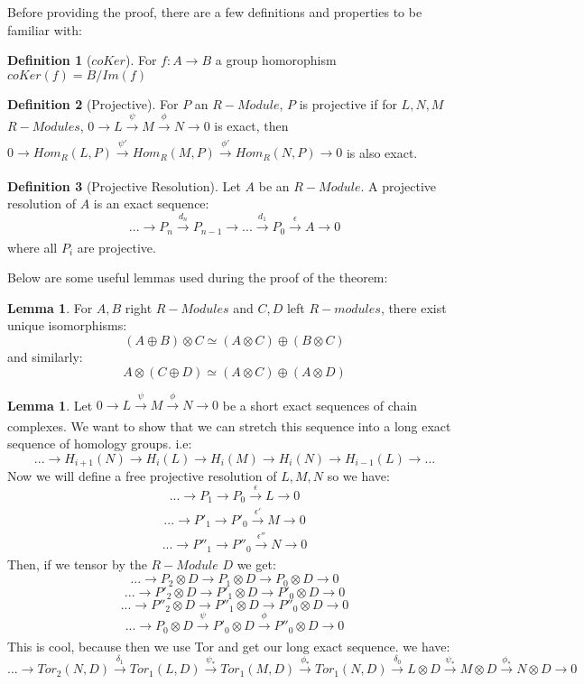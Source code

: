 \documentclass[11pt]{article}
\theoremstyle{definition}
\newtheorem{definition}{Definition}[section]
\newtheorem{lemma}[theorem]{Lemma}
\begin{document}
Before providing the proof, there are a few definitions and properties to be familiar with: 
\begin{definition}[$coKer$]
For $f:A\rightarrow B$ a group homorophism $coKer(f)=B/Im(f)$
\end{definition}
\begin{definition}[Projective]
For $P$ an $R-Module$, $P$ is {projective} if for $L,N,M$ $R-Modules$,  $0\rightarrow L\xrightarrow[]{\psi} M \xrightarrow[]{\phi} N\rightarrow 0$ is exact, then $0\rightarrow Hom_R(L,P)\xrightarrow[]{\psi'} Hom_R(M,P) \xrightarrow[]{\phi'} Hom_R(N,P)\rightarrow 0$ is also exact.
\end{definition}
\begin{definition}[Projective Resolution]
Let $A$ be an $R-Module$. A projective resolution of $A$ is an exact sequence: 
    $$...\rightarrow P_n\xrightarrow[]{d_n} P_{n-1}\rightarrow...\xrightarrow[]{d_1}P_0\xrightarrow[]{\epsilon} A\rightarrow 0$$ 
    where all $P_i$ are projective.
\end{definition}
Below are some useful lemmas used during the proof of the theorem:
\begin{lemma}
For $A,B$ right $R-Modules$ and $C,D$ left $R-modules$, there exist unique isomorphisms:
    $$(A\oplus B)\otimes C\simeq (A\otimes C)\oplus (B\otimes C)$$
    and similarly:
    $$A\otimes(C\oplus D)\simeq (A\otimes C)\oplus (A\otimes D)$$
\end{lemma}
\begin{lemma}
Let $0\rightarrow L\xrightarrow[]{\psi} M \xrightarrow[]{\phi} N\rightarrow 0$ be a short exact sequences of chain complexes. We want to show that we can stretch this sequence into a long exact sequence of homology groups. i.e:
    $$...\rightarrow H_{i+1}(N)\rightarrow H_{i}(L)\rightarrow H_{i}(M)\rightarrow H_{i}(N)\rightarrow H_{i-1}(L)\rightarrow...$$ Now we will define a free projective resolution of $L,M,N$ so we have: 
    $$...\rightarrow P_1\rightarrow P_0\xrightarrow[]{\epsilon} L\rightarrow 0$$
    $$...\rightarrow P'_1\rightarrow P'_0\xrightarrow[]{\epsilon'} M\rightarrow 0$$
    $$...\rightarrow P''_1\rightarrow P''_0\xrightarrow[]{\epsilon''} N\rightarrow 0$$
    Then, if we tensor by the $R-Module$ $D$ we get:
    $$...\rightarrow P_2\otimes D \rightarrow P_1\otimes D\rightarrow P_0\otimes D\rightarrow 0$$
    $$...\rightarrow P'_2\otimes D \rightarrow P'_1\otimes D\rightarrow P'_0\otimes D\rightarrow 0$$
    $$...\rightarrow P''_2\otimes D \rightarrow P''_1\otimes D\rightarrow P''_0\otimes D\rightarrow 0$$
    $$...\rightarrow P_0\otimes D \xrightarrow[]{\psi} P'_0\otimes D\xrightarrow[]{\phi} P''_0\otimes D\rightarrow 0$$
    This is cool, because then we use Tor and get our long exact sequence. we have:
    $$...\rightarrow Tor_2(N,D)\xrightarrow[]{\delta_1}Tor_1(L,D)\xrightarrow[]{\psi_*}Tor_1(M,D)\xrightarrow[]{\phi_*}Tor_1(N,D)\xrightarrow[]{\delta_0}L\otimes D\xrightarrow[]{\psi_*}M\otimes D\xrightarrow[]{\phi_*}N\otimes D\rightarrow 0$$
\end{lemma}
\end{document}
